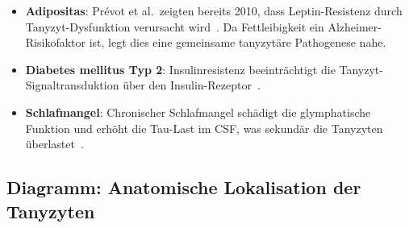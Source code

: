 ﻿\documentclass[12pt,a4paper]{article}
\theoremstyle{definition}
\begin{document}
	\begin{itemize}
		\item \textbf{Adipositas}: Prévot et al.\ zeigten bereits 2010, dass Leptin-Resistenz durch Tanyzyt-Dysfunktion verursacht wird~\cite{Prevot2010}. Da Fettleibigkeit ein Alzheimer-Risikofaktor ist, legt dies eine gemeinsame tanyzytäre Pathogenese nahe.
		\item \textbf{Diabetes mellitus Typ 2}: Insulinresistenz beeinträchtigt die Tanyzyt-Signaltrans\-duktion über den Insulin-Rezeptor~\cite{Benner2018}.
		\item \textbf{Schlafmangel}: Chronischer Schlafmangel schädigt die glymphatische Funktion und erhöht die Tau-Last im CSF, was sekundär die Tanyzyten überlastet~\cite{Xie2013}.
	\end{itemize}
	
	\subsection{Diagramm: Anatomische Lokalisation der Tanyzyten}
	
\end{document}
